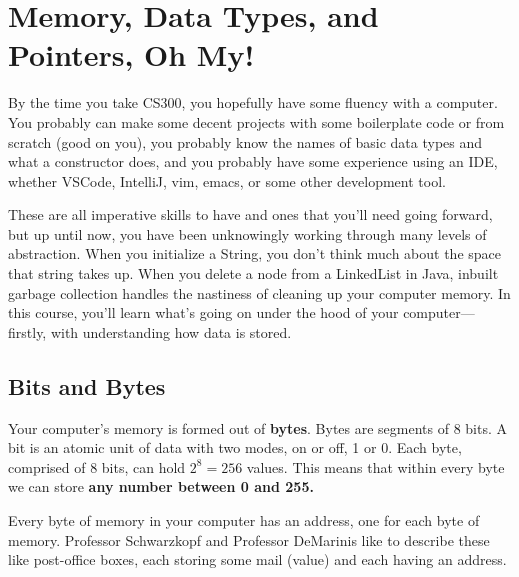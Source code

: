 \documentclass[a4paper, 12pt]{article}
\begin{document}
\section{Memory, Data Types, and Pointers, Oh My!}
\begin{flushleft}
	By the time you take CS300, you hopefully have some fluency with a computer. You probably can make some decent projects with some boilerplate code or from scratch (good on you),
	you probably know the names of basic data types and what a constructor does, and you probably have some experience using an IDE, whether VSCode, IntelliJ, vim, emacs, or some other development tool.

	These are all imperative skills to have and ones that you'll need going forward, but up until now, you have been unknowingly working through many levels of abstraction. When you
	initialize a String, you don't think much about the space that string takes up. When you delete a node from a LinkedList in Java, inbuilt garbage collection handles the nastiness
	of cleaning up your computer memory. In this course, you'll learn what's going on under the hood of your computer---firstly, with understanding how data is stored.

\end{flushleft}
\subsection{Bits and Bytes}
\label{subsec:bitsbytes}
\begin{flushleft}

	Your computer's memory is formed out of \textbf{bytes}. Bytes are segments of 8 bits. A bit is an atomic unit of data with two modes, on or off, 1 or 0. Each byte, comprised of 8 bits,
	can hold \(2^8 =  256\) values. This means that within every byte we can store \textbf{any number between 0 and 255.}

	Every byte of memory in your computer has an address, one for each byte of memory. Professor Schwarzkopf and Professor DeMarinis like to describe these like post-office boxes, each storing some
	mail (value) and each having an address.
	\newline
\end{flushleft}

\end{document}
